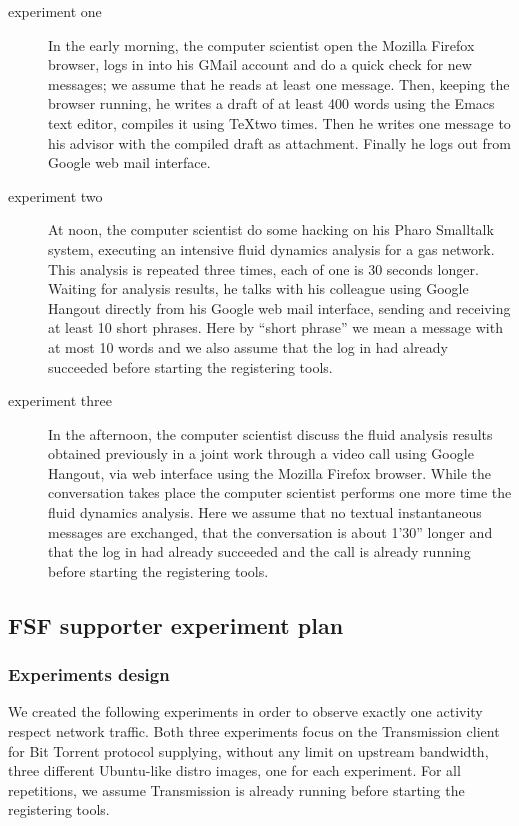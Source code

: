 \documentclass[10pt,a4paper]{article}
\begin{document}
    \begin{description}
    \item[experiment one] In the early morning, the computer scientist
      open the Mozilla Firefox browser, logs in into his GMail account
      and do a quick check for new messages; we assume that he reads
      at least one message. Then, keeping the browser running, he
      writes a draft of at least 400 words using the Emacs text
      editor, compiles it using \TeX two times. Then he writes one
      message to his advisor with the compiled draft as
      attachment. Finally he logs out from Google web mail interface.
    \item[experiment two] At noon, the computer scientist do some
      hacking on his Pharo Smalltalk system, executing an intensive
      fluid dynamics analysis for a gas network. This analysis is
      repeated three times, each of one is 30 seconds longer. Waiting
      for analysis results, he talks with his colleague using Google
      Hangout directly from his Google web mail interface, sending and
      receiving at least 10 short phrases. Here by ``short phrase'' we
      mean a message with at most 10 words and we also assume that the
      log in had already succeeded before starting the registering
      tools.
    \item[experiment three] In the afternoon, the computer scientist
      discuss the fluid analysis results obtained previously in a
      joint work through a video call using Google Hangout, via web
      interface using the Mozilla Firefox browser. While the
      conversation takes place the computer scientist performs one
      more time the fluid dynamics analysis. Here we assume that no
      textual instantaneous messages are exchanged, that the
      conversation is about 1'30'' longer and that the log in had
      already succeeded and the call is already running before
      starting the registering tools.
    \end{description}

    \newpage
    \subsection{FSF supporter experiment plan}

    \subsubsection*{Experiments design }
    We created the following experiments in order to observe exactly
    one activity respect network traffic. Both three experiments focus
    on the Transmission client for Bit Torrent protocol supplying,
    without any limit on upstream bandwidth, three different
    Ubuntu-like distro images, one for each experiment. For all
    repetitions, we assume Transmission is already running before
    starting the registering tools.
\end{document}
